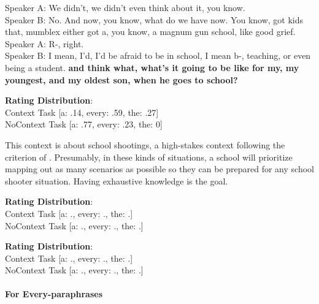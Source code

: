 \documentclass[12pt,letterpaper,table,svgnames,dvipsnames]{article}
\begin{document}
\begin{exe}
    \ex {}
    \begin{xlist}
    \ex {}
    Speaker A: We didn't, we didn't even think about it, you know.\\
    Speaker B: No. And now, you know, what do we have now. You know, got kids that, mumblex either got a, you know, a magnum gun school, like good grief.\\
    Speaker A: R-, right.\\
    Speaker B: I mean, I'd, I'd be afraid to be in school, I mean b-, teaching, or even being a student. \textbf{and think what, what's it going to be like for my, my youngest, and my oldest son, when he goes to school?}
    
    \ex \textbf{Rating Distribution}:\\
    Context Task [a: .14, every: .59, the: .27]\\
    NoContext Task [a: .77, every: .23, the: 0]
    \end{xlist}
\end{exe}
This context is about school shootings, a high-stakes context following the criterion of . Presumably, in these kinds of situations, a school will prioritize mapping out as many scenarios as possible so they can be prepared for any school shooter situation. Having exhaustive knowledge is the goal. 


\begin{exe}
    \ex {}
    \begin{xlist}
        \ex {}
        
        \ex \textbf{Rating Distribution}:\\
        Context Task [a: ., every: ., the: .]\\
        NoContext Task [a: ., every: ., the: .]
    \end{xlist}
\end{exe}


\begin{exe}
    \ex {}
    \begin{xlist}
        \ex {}
        
        \ex \textbf{Rating Distribution}:\\
        Context Task [a: ., every: ., the: .]\\
        NoContext Task [a: ., every: ., the: .]
    \end{xlist}
\end{exe}


\paragraph{For Every-paraphrases}
\end{document}
